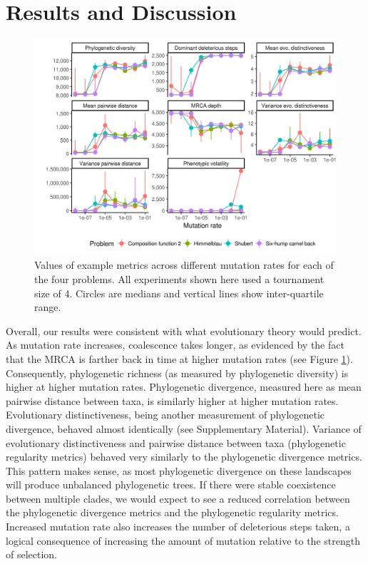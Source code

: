 \documentclass[letterpaper]{article}
\begin{document}
\section{Results and Discussion}


\begin{figure}
\includegraphics[width=7in]{figs/all_mutation_rate.png}
\caption{Values of example metrics across different mutation rates for each of the four problems. All experiments shown here used a tournament size of 4. Circles are medians and vertical lines show inter-quartile range.}
\label{fig:mutation_rate}
\end{figure}

Overall, our results were consistent with what evolutionary theory would predict. As mutation rate increases, coalescence takes longer, as evidenced by the fact that the MRCA is farther back in time at higher mutation rates (see Figure \ref{fig:mutation_rate}). Consequently, phylogenetic richness (as measured by phylogenetic diversity) is higher at higher mutation rates. Phylogenetic divergence, measured here as mean pairwise distance between taxa, is similarly higher at higher mutation rates. Evolutionary distinctiveness, being another measurement of phylogenetic divergence, behaved almost identically (see Supplementary Material). Variance of evolutionary distinctiveness and pairwise distance between taxa (phylogenetic regularity metrics) behaved very similarly to the phylogenetic divergence metrics. This pattern makes sense, as most phylogenetic divergence on these landscapes will produce unbalanced phylogenetic trees. If there were stable coexistence between multiple clades, we would expect to see a reduced correlation between the phylogenetic divergence metrics and the phylogenetic regularity metrics. Increased mutation rate also increases the number of deleterious steps taken, a logical consequence of increasing the amount of mutation relative to the strength of selection.
\end{document}
